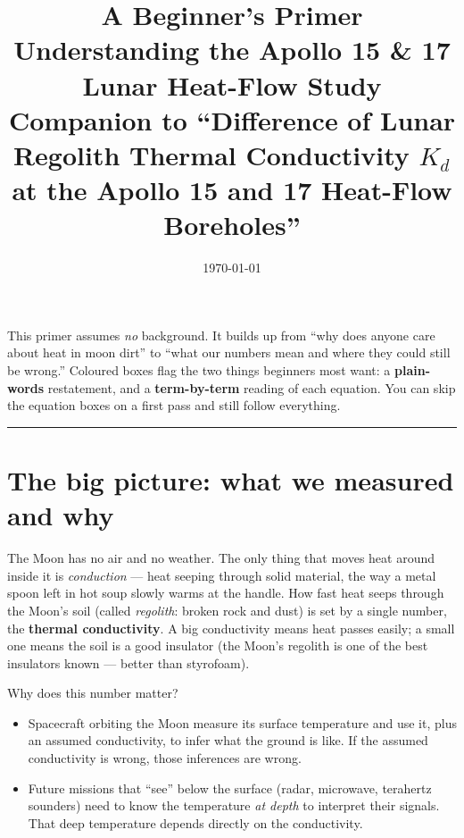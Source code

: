 \documentclass[11pt]{article}
\title{\bfseries A Beginner's Primer\\[2pt]
\large Understanding the Apollo 15 \& 17 Lunar Heat-Flow Study\\
\normalsize\textnormal{Companion to ``Difference of Lunar Regolith Thermal
Conductivity $K_d$ at the Apollo 15 and 17 Heat-Flow Boreholes''}}
\author{}
\date{\today}
\begin{document}
\maketitle
\thispagestyle{empty}

\begin{plainbox}[title={How to read this document}]
This primer assumes \emph{no} background. It builds up from ``why does
anyone care about heat in moon dirt'' to ``what our numbers mean and
where they could still be wrong.'' Coloured boxes flag the two things
beginners most want: a \textcolor{teal!60!black}{\textbf{plain-words}}
restatement, and a \textcolor{coral!55!black}{\textbf{term-by-term}}
reading of each equation. You can skip the equation boxes on a first
pass and still follow everything.
\end{plainbox}

\tableofcontents
\bigskip
\hrule

\section{The big picture: what we measured and why}

The Moon has no air and no weather. The only thing that moves heat
around inside it is \emph{conduction} --- heat seeping through solid
material, the way a metal spoon left in hot soup slowly warms at the
handle. How fast heat seeps through the Moon's soil (called
\emph{regolith}: broken rock and dust) is set by a single number,
the \textbf{thermal conductivity}. A big conductivity means heat passes
easily; a small one means the soil is a good insulator (the Moon's
regolith is one of the best insulators known --- better than styrofoam).

Why does this number matter?

\begin{itemize}
\item Spacecraft orbiting the Moon measure its surface temperature and
      use it, plus an assumed conductivity, to infer what the ground is
      like. If the assumed conductivity is wrong, those inferences are
      wrong.
\item Future missions that ``see'' below the surface (radar, microwave,
      terahertz sounders) need to know the temperature \emph{at depth}
      to interpret their signals. That deep temperature depends directly
      on the conductivity.
\end{itemize}
\end{document}
